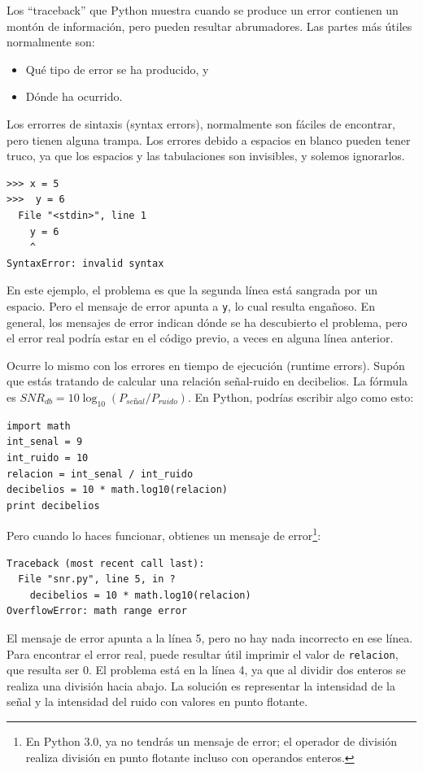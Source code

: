 Los ``traceback'' que Python muestra cuando se produce un error contienen
un montón de información, pero pueden resultar abrumadores. Las partes
más útiles normalmente son:

\begin{itemize}

\item Qué tipo de error se ha producido, y

\item Dónde ha ocurrido.

\end{itemize}

Los errorres de sintaxis (syntax errors), normalmente son fáciles de encontrar, pero
tienen alguna trampa. Los errores debido a espacios en blanco pueden tener truco,
ya que los espacios y las tabulaciones son invisibles, y solemos ignorarlos.


\beforeverb
\begin{verbatim}
>>> x = 5
>>>  y = 6
  File "<stdin>", line 1
    y = 6
    ^
SyntaxError: invalid syntax
\end{verbatim}
\afterverb
%
En este ejemplo, el problema es que la segunda línea está sangrada por
un espacio. Pero el mensaje de error apunta a {\tt y}, lo cual
resulta engañoso. En general, los mensajes de error indican dónde se ha
descubierto el problema, pero el error real podría estar en el código
previo, a veces en alguna línea anterior.


Ocurre lo mismo con los errores en tiempo de ejecución (runtime errors). Supón que estás tratando
de calcular una relación señal-ruido en decibelios. La fórmula
es $SNR_{db} = 10 \log_{10} (P_{señal} / P_{ruido})$. En Python,
podrías escribir algo como esto:

\beforeverb
\begin{verbatim}
import math
int_senal = 9
int_ruido = 10
relacion = int_senal / int_ruido
decibelios = 10 * math.log10(relacion)
print decibelios
\end{verbatim}
\afterverb
%
Pero cuando lo haces funcionar, obtienes un mensaje de error\footnote{En Python 3.0,
ya no tendrás un mensaje de error; el operador de división realiza
división en punto flotante incluso con operandos enteros.}:


\beforeverb
\begin{verbatim}
Traceback (most recent call last):
  File "snr.py", line 5, in ?
    decibelios = 10 * math.log10(relacion)
OverflowError: math range error
\end{verbatim}
\afterverb
%
El mensaje de error apunta a la línea 5, pero no hay nada
incorrecto en ese línea. Para encontrar el error real, puede resultar
útil imprimir el valor de {\tt relacion}, que resulta ser
0. El problema está en la línea 4, ya que al dividir dos enteros
se realiza una división hacia abajo. La solución es representar la intensidad
de la señal y la intensidad del ruido con valores en punto flotante.

